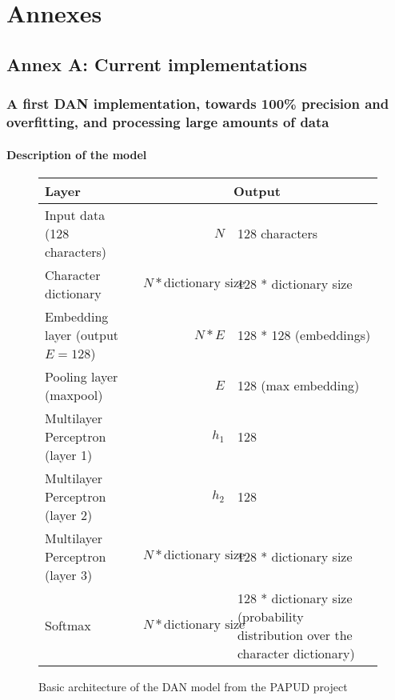 \part*{Annexes}

\chapter*{Annex A: Current implementations}

\makeatletter
\renewcommand{\thesection}{\@arabic\c@section}
\makeatother

\section{A first DAN implementation, towards 100\% precision and overfitting, and processing large amounts of data\label{annex}}

\subsection{Description of the model}
\begin{figure}[H]
\begin{center}
\begin{tabularx}{.9\textwidth}{|l|r|X|}
	\hline 
	{\bfseries Layer} & \multicolumn{2}{|c|}{\bfseries Output} \\ 
	\hline 
	Input data (128 characters) &  $N$ & {128 characters} \\ 
	\hline 
	Character dictionary & $N * \text{dictionary size}$ & 128 * dictionary size \\ 
	\hline 
	Embedding layer (output $E=128$) & $N * E$ & 128 * 128 (embeddings) \\ 
	\hline 
	Pooling layer (maxpool) & $E$ & 128 (max embedding) \\ 
	\hline 
	Multilayer Perceptron (layer 1) & $h_1$ & 128 \\ 
	\hline 
	Multilayer Perceptron (layer 2) & $h_2$ & 128 \\ 
	\hline 
	Multilayer Perceptron (layer 3) & $N * \text{dictionary size}$ & 128 * dictionary size \\ 
	\hline 
	Softmax & $N * \text{dictionary size}$ & 128 * dictionary size (probability distribution over the character dictionary) \\ 
	\hline 
\end{tabularx} 
\end{center}
\caption{Basic architecture of the DAN model from the PAPUD project}
\end{figure} 

